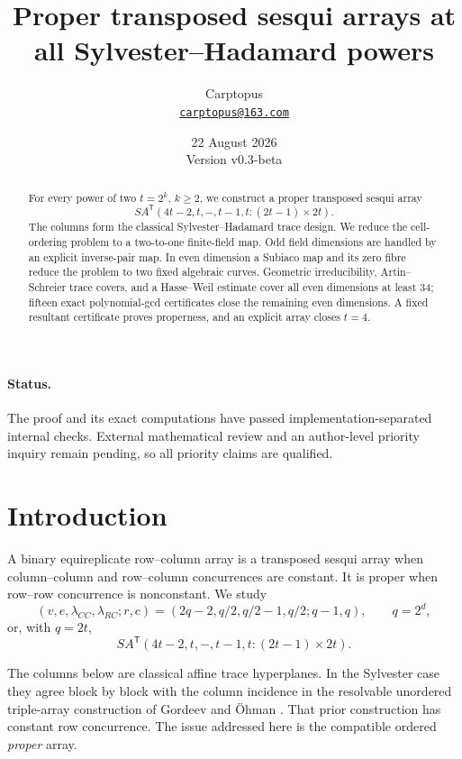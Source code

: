 \documentclass[11pt]{article}
\title{Proper transposed sesqui arrays at all Sylvester--Hadamard powers}
\author{Carptopus\\\href{mailto:carptopus@163.com}{\texttt{carptopus@163.com}}}
\date{22 August 2026\\\small Version v0.3-beta}
\theoremstyle{definition}\newtheorem{definition}[theorem]{Definition}
\theoremstyle{remark}\newtheorem{remark}[theorem]{Remark}
\newcommand{\SA}{SA^{\mathsf T}}
\begin{document}
\maketitle

\begin{abstract}
For every power of two \(t=2^k\), \(k\geq2\), we construct a proper
transposed sesqui array
\[
 \SA(4t-2,t,-,t-1,t:(2t-1)\times2t).
\]
The columns form the classical Sylvester--Hadamard trace design.  We reduce
the cell-ordering problem to a two-to-one finite-field map.  Odd field
dimensions are handled by an explicit inverse-pair map.  In even dimension a
Subiaco map and its zero fibre reduce the problem to two fixed algebraic
curves.  Geometric irreducibility, Artin--Schreier trace covers, and a
Hasse--Weil estimate cover all even dimensions at least \(34\); fifteen exact
polynomial-gcd certificates close the remaining even dimensions.  A fixed
resultant certificate proves properness, and an explicit array closes \(t=4\).
\end{abstract}

\paragraph{Status.}
The proof and its exact computations have passed implementation-separated
internal checks.  External mathematical review and an author-level priority
inquiry remain pending, so all priority claims are qualified.

\section{Introduction}
A binary equireplicate row--column array is a transposed sesqui array when
column--column and row--column concurrences are constant.  It is proper when
row--row concurrence is nonconstant.  We study
\begin{equation}
 (v,e,\lambda_{CC},\lambda_{RC};r,c)
 =(2q-2,q/2,q/2-1,q/2;q-1,q),\qquad q=2^d,
 \label{eq:qparams}
\end{equation}
or, with \(q=2t\),
\begin{equation}
 \SA(4t-2,t,-,t-1,t:(2t-1)\times2t).
 \label{eq:tparams}
\end{equation}

The columns below are classical affine trace hyperplanes.  In the Sylvester
case they agree block by block with the column incidence in the resolvable
unordered triple-array construction of Gordeev and Öhman
\cite[Theorem~5.13]{gordeev-ohman}.  That prior construction has constant
row concurrence.  The issue addressed here is the compatible ordered
\emph{proper} array.
\end{document}
